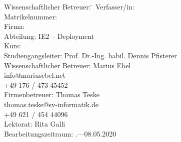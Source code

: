 \begin{titlepage}
\begin{center}
\begin{minipage}{\textwidth}
\begin{tabbing}
	Wissenschaftlicher Betreuer: \hspace{0.85cm}\=\kill
	Verfasser/in: \> \DerAutorDerArbeit \\[1.5mm]
	Matrikelnummer:  \\[1.5mm]
	Firma: \> \DerNameDerFirma  \\[1.5mm]
	Abteilung: \> IE2 -- Deployment \\[1.5mm]
	Kurs: \> \DieKursbezeichnung \\[1.5mm]
	Studiengangsleiter: \> Prof. Dr.-Ing. habil. Dennis Pfisterer \\[1.5mm]
	Wissenschaftlicher Betreuer: \> Marius Ebel \\
	\> info@mariusebel.net \\
	\> +49 176 / 473 45452 \\[1.5mm]
	Firmenbetreuer: \> Thomas Teske \\
	\> thomas.teske@sv-informatik.de \\
	\> +49 621 / 454 44096 \\[1.5mm]
	Lektorat: \> Rita Galli \\[1.5mm]
	Bearbeitungszeitraum: .---08.05.2020
\end{tabbing}
\end{minipage}

\end{center}

\end{titlepage}